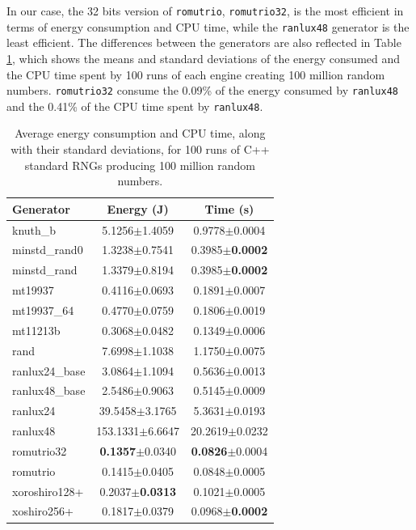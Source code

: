 \documentclass[dvipsnames,format=sigconf,anonymous=true,review=true]{acmart}
\begin{document}
In our case, the 32 bits version of \texttt{romutrio}, \texttt{romutrio32}, is the most efficient in terms of energy consumption and CPU time, while the \texttt{ranlux48} generator is the least efficient. The differences between the generators are also reflected in Table \ref{tab:pkg}, which shows the means and standard deviations of the energy consumed and the CPU time spent by 100 runs of each engine creating 100 million random numbers. \texttt{romutrio32} consume the 0.09\% of the energy consumed by \texttt{ranlux48} and the 0.41\% of the CPU time spent by \texttt{ranlux48}.

\begin{table}
\centering
\caption{Average energy consumption and CPU time, along with their standard deviations, for 100 runs of C++ standard RNGs producing 100 million random numbers.}
\begin{tabular}{lcc}
\toprule
Generator & Energy (J) & Time (s) \\
\midrule
knuth\_b & 5.1256$\pm$1.4059 & 0.9778$\pm$0.0004 \\
minstd\_rand0 & 1.3238$\pm$0.7541 & 0.3985$\pm$\textbf{0.0002} \\
minstd\_rand & 1.3379$\pm$0.8194 & 0.3985$\pm$\textbf{0.0002} \\
mt19937 & 0.4116$\pm$0.0693 & 0.1891$\pm$0.0007 \\
mt19937\_64 & 0.4770$\pm$0.0759 & 0.1806$\pm$0.0019 \\
mt11213b & 0.3068$\pm$0.0482 & 0.1349$\pm$0.0006 \\
rand & 7.6998$\pm$1.1038 & 1.1750$\pm$0.0075 \\
ranlux24\_base & 3.0864$\pm$1.1094 & 0.5636$\pm$0.0013 \\
ranlux48\_base & 2.5486$\pm$0.9063 & 0.5145$\pm$0.0009 \\
ranlux24 & 39.5458$\pm$3.1765 & 5.3631$\pm$0.0193 \\
ranlux48 & 153.1331$\pm$6.6647 & 20.2619$\pm$0.0232 \\
romutrio32 & \textbf{0.1357}$\pm$0.0340 & \textbf{0.0826}$\pm$0.0004 \\
romutrio & 0.1415$\pm$0.0405 & 0.0848$\pm$0.0005 \\
xoroshiro128+ & 0.2037$\pm$\textbf{0.0313} & 0.1021$\pm$0.0005 \\
xoshiro256+ & 0.1817$\pm$0.0379 & 0.0968$\pm$\textbf{0.0002} \\
\bottomrule
\end{tabular}
\label{tab:pkg}
\end{table}
\end{document}
